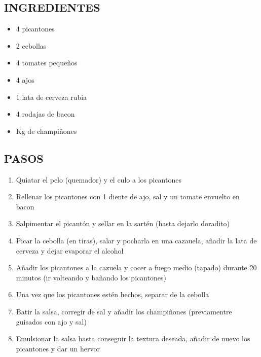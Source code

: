 

\subsection*{INGREDIENTES}
\begin{itemize}
    \item 4 picantones
    \item 2 cebollas
    \item 4 tomates pequeños
    \item 4 ajos
    \item 1 lata de cerveza rubia
    \item 4 rodajas de bacon
    \item {} Kg de champiñones
\end{itemize}

\subsection*{PASOS}
\begin{enumerate}
    \item Quiatar el pelo (quemador) y el culo a los picantones
    \item Rellenar los picantones con 1 diente de ajo, sal y un tomate envuelto en bacon
    \item Salpimentar el picantón y sellar en la sartén (hasta dejarlo doradito)
    \item Picar la cebolla (en tiras), salar y pocharla en una cazauela, añadir la  lata de cerveza y dejar evaporar el alcohol
    \item Añadir los picantones a la cazuela y cocer a fuego medio (tapado) durante 20 minutos (ir volteando y bañando los picantones)
    \item Una vez que los picantones estén hechos, separar de la cebolla
    \item Batir la salsa, corregir de sal y añadir los champiñones (previamentre guisados con ajo y sal)
    \item Emulsionar la salsa hasta conseguir la textura deseada, añadir de nuevo los picantones y dar un hervor
\end{enumerate}